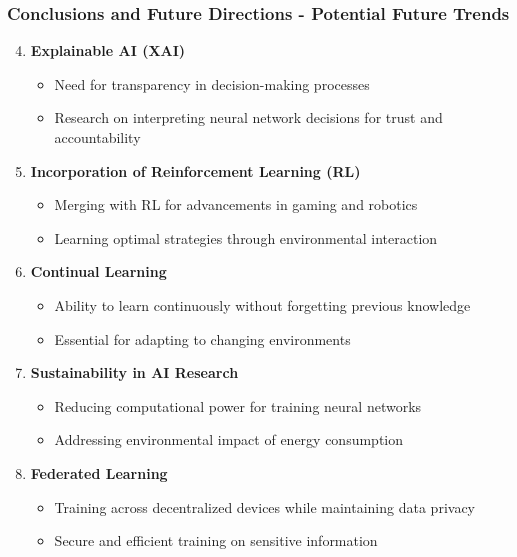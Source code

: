 \documentclass[aspectratio=169]{beamer}
\begin{document}
\begin{frame}[fragile]
    \frametitle{Conclusions and Future Directions - Potential Future Trends}
    \begin{enumerate}
        \setcounter{enumi}{3} %
        \item \textbf{Explainable AI (XAI)}
        \begin{itemize}
            \item Need for transparency in decision-making processes
            \item Research on interpreting neural network decisions for trust and accountability
        \end{itemize}

        \item \textbf{Incorporation of Reinforcement Learning (RL)}
        \begin{itemize}
            \item Merging with RL for advancements in gaming and robotics
            \item Learning optimal strategies through environmental interaction
        \end{itemize}
        
        \item \textbf{Continual Learning}
        \begin{itemize}
            \item Ability to learn continuously without forgetting previous knowledge
            \item Essential for adapting to changing environments
        \end{itemize}

        \item \textbf{Sustainability in AI Research}
        \begin{itemize}
            \item Reducing computational power for training neural networks
            \item Addressing environmental impact of energy consumption
        \end{itemize}

        \item \textbf{Federated Learning}
        \begin{itemize}
            \item Training across decentralized devices while maintaining data privacy
            \item Secure and efficient training on sensitive information
        \end{itemize}
    \end{enumerate}
\end{frame}
\end{document}
